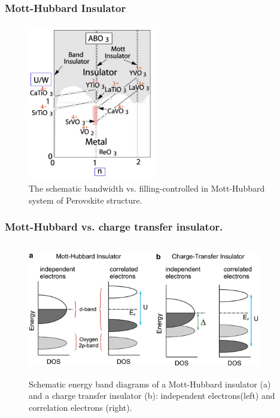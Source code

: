 \frame
{
	\frametitle{\textrm{Mott-Hubbard Insulator}}
\begin{figure}[h!]
\centering
\vspace*{-0.20in}
\includegraphics[height=2.70in,width=2.2in,viewport=0 0 660 840,clip]{Figures/Band-Mott_Hubard-Insulator.jpeg}
\caption{\tiny \textrm{The schematic bandwidth vs. filling-controlled in Mott-Hubbard system of Perovskite structure.}}%
\label{Bandwidth-Mott_Hubard-Insulator}
\end{figure}
}

\frame
{
	\frametitle{\textrm{Mott-Hubbard vs. charge transfer insulator.}}
\begin{figure}[h!]
\centering
\vspace*{-0.10in}
\includegraphics[height=2.30in,width=4.0in,viewport=0 0 320 170,clip]{Figures/Schematic-energy-band-diagrams-of-a-Mott-Hubbard-insulator-and-a-charge-transfer-insulator-independent_left-correlation_right.jpg}
\caption{\tiny \textrm{Schematic energy band diagrams of a Mott-Hubbard insulator (a) and a charge transfer insulator (b): independent electrons(left)  and correlation electrons (right).}}%
\label{Band-Mott_Hubard_vs_charge-Insulator}
\end{figure}
}


